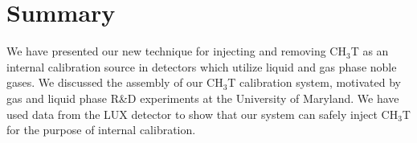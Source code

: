 \section{Summary}

We have presented our new technique for injecting and removing CH$_3$T as an internal calibration source in detectors which utilize liquid and gas phase noble gases.  We discussed the assembly of our CH$_3$T calibration system, motivated by gas and liquid phase R\&D experiments at the University of Maryland.  We have used data from the LUX detector to show that our system can safely inject CH$_3$T for the purpose of internal calibration.
